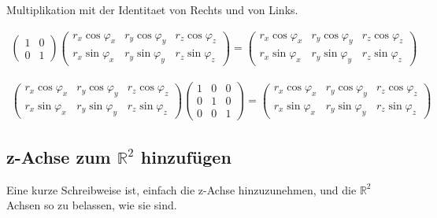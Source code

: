 \documentclass[a4paper]{article}
\begin{document}
Multiplikation mit der Identitaet von Rechts und von Links.

\begin{displaymath}
\begin{align}
\begin{pmatrix}1&0\\0&1\end{pmatrix}\begin{pmatrix}
r_x \cos \varphi_x&
r_y \cos \varphi_y&
r_z \cos \varphi_z\\
r_x \sin \varphi_x&
r_y \sin \varphi_y&
r_z \sin \varphi_z
\end{pmatrix}=\begin{pmatrix}
r_x \cos \varphi_x&
r_y \cos \varphi_y&
r_z \cos \varphi_z\\
r_x \sin \varphi_x&
r_y \sin \varphi_y&
r_z \sin \varphi_z
\end{pmatrix}
\end{align}
\end{displaymath}

\begin{displaymath}
\begin{align}
\begin{pmatrix}
r_x \cos \varphi_x&
r_y \cos \varphi_y&
r_z \cos \varphi_z\\
r_x \sin \varphi_x&
r_y \sin \varphi_y&
r_z \sin \varphi_z
\end{pmatrix}\begin{pmatrix}1&0&0\\0&1&0\\0&0&1\end{pmatrix}=\begin{pmatrix}
r_x \cos \varphi_x&
r_y \cos \varphi_y&
r_z \cos \varphi_z\\
r_x \sin \varphi_x&
r_y \sin \varphi_y&
r_z \sin \varphi_z
\end{pmatrix}
\end{align}
\end{displaymath}


\subsection{z-Achse zum $\mathbb{R}^{2}$ hinzuf\"ugen}
 
Eine kurze Schreibweise ist, einfach die z-Achse hinzuzunehmen, und die $\mathbb{R}^{2}$ Achsen so zu belassen, wie sie sind.
\end{document}
